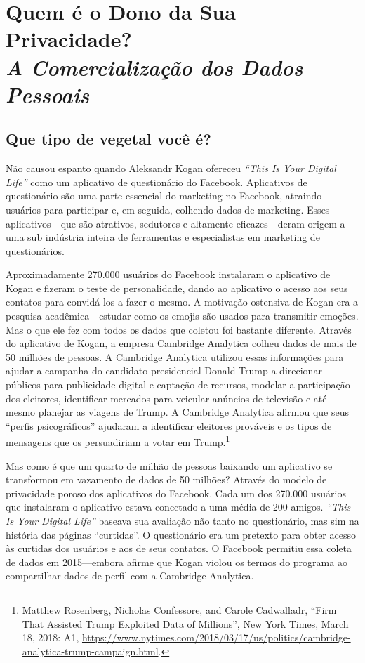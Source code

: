 \documentclass{book}
\newcommand{\ingles}[1]{\textit{#1}}
\begin{document}
\chapter[Quem é o Dono da Sua Privacidade?]{Quem é o Dono da Sua Privacidade?\\\large\textit{A Comercialização dos Dados Pessoais}}
\label{cap3:quem}

\section{Que tipo de vegetal você é?}
\label{cap3:quem-que}
Não causou espanto quando Aleksandr Kogan ofereceu \ingles{``This Is Your Digital Life''}
como um aplicativo de questionário do Facebook. Aplicativos de questionário são
uma parte essencial do marketing no Facebook, atraindo usuários para participar
e, em seguida, colhendo dados de marketing. Esses aplicativos---que são atrativos,
sedutores e altamente eficazes---deram origem a uma sub indústria inteira de
ferramentas e especialistas em marketing de questionários.

Aproximadamente 270.000 usuários do Facebook instalaram o aplicativo de Kogan
e fizeram o teste de personalidade, dando ao aplicativo o acesso aos seus contatos
para convidá-los a fazer o mesmo. A motivação ostensiva de Kogan era a pesquisa
acadêmica---estudar como os emojis são usados para transmitir emoções. Mas o que
ele fez com todos os dados que coletou foi bastante diferente. Através do
aplicativo de Kogan, a empresa Cambridge Analytica colheu dados de mais de 50
milhões de pessoas. A Cambridge Analytica utilizou essas informações para ajudar
a campanha do candidato presidencial Donald Trump a direcionar públicos para    
publicidade digital e captação de recursos, modelar a participação dos eleitores,
identificar mercados para veicular anúncios de televisão e até mesmo planejar as
viagens de Trump. A Cambridge Analytica afirmou que seus ``perfis psicográficos''
ajudaram a identificar eleitores prováveis e os tipos de mensagens que os
persuadiriam a votar em Trump.\footnote{Matthew Rosenberg, Nicholas Confessore,
and Carole Cadwalladr, ``Firm That Assisted Trump Exploited Data of Millions'',
New York Times, March 18, 2018: A1,
\url{https://www.nytimes.com/2018/03/17/us/politics/cambridge-analytica-trump-campaign.html}.}

Mas como é que um quarto de milhão de pessoas baixando um aplicativo se transformou
em vazamento de dados de 50 milhões? Através do modelo de privacidade poroso dos
aplicativos do Facebook. Cada um dos 270.000 usuários que instalaram o aplicativo
estava conectado a uma média de 200 amigos. \ingles{``This Is Your Digital Life''}
baseava sua avaliação não tanto no questionário, mas sim na história das páginas
``curtidas''. O questionário era um pretexto para obter acesso às curtidas dos
usuários e aos de seus contatos. O Facebook permitiu essa coleta de dados em 
2015---embora afirme que Kogan violou os termos do programa ao compartilhar dados
de perfil com a Cambridge Analytica.
\end{document}
